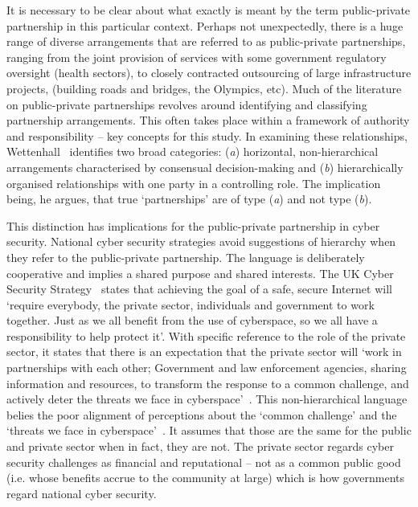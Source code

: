 \documentclass[a4paper,11pt]{article}
\begin{document}
It is necessary to be clear about what exactly is meant by the term
public-private partnership in this particular context. Perhaps not
unexpectedly, there is a huge range of diverse arrangements that are
referred to as public-private partnerships, ranging from the joint
provision of services with some government regulatory oversight
(health sectors), to closely contracted outsourcing of large
infrastructure projects, (building roads and bridges, the Olympics,
etc). Much of the literature on public-private partnerships revolves
around identifying and classifying partnership arrangements. This
often takes place within a framework of authority and responsibility
-- key concepts for this study. In examining these relationships,
Wettenhall~\cite{wettenhall:2003} identifies two broad categories:
({\emph{a}}) horizontal, non-hierarchical arrangements characterised
by consensual decision-making and ({\emph{b}}) hierarchically
organised relationships with one party in a controlling role. The
implication being, he argues, that true `partnerships' are of type
({\emph{a}}) and not type ({\emph{b}}).

This distinction has implications for the public-private partnership
in cyber security. National cyber security strategies avoid
suggestions of hierarchy when they refer to the public-private
partnership. The language is deliberately cooperative and implies a
shared purpose and shared interests. The UK Cyber Security
Strategy~\cite{ukcss:2011} states that achieving the goal of a safe,
secure Internet will `require everybody, the private sector,
individuals and government to work together. Just as we all benefit
from the use of cyberspace, so we all have a responsibility to help
protect it'. With specific reference to the role of the private
sector, it states that there is an expectation that the private sector
will `work in partnerships with each other; Government and law
enforcement agencies, sharing information and resources, to transform
the response to a common challenge, and actively deter the threats we
face in cyberspace'~\cite{ukcss:2013}.  This non-hierarchical language
belies the poor alignment of perceptions about the `common challenge'
and the `threats we face in cyberspace'~\cite{uknao:2013}. It assumes
that those are the same for the public and private sector when in
fact, they are not. The private sector regards cyber security
challenges as financial and reputational -- not as a common public
good (i.e. whose benefits accrue to the community at large) which is
how governments regard national cyber security.
\end{document}
